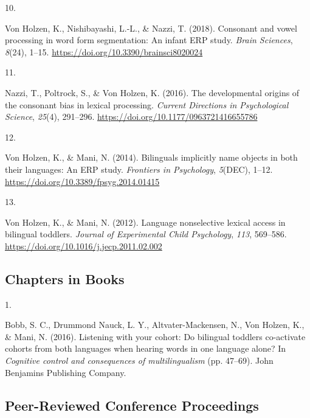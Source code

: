 \documentclass[10pt,a4paper,]{article}
\newlength{\cslhangindent}
\newlength{\csllabelwidth}
\newcommand{\CSLLeftMargin}[1]{\parbox[t]{\csllabelwidth}{\hfill #1~}}
\newcommand{\CSLRightInline}[1]{\parbox[t]{\linewidth - \cslhangindent - \csllabelwidth}{#1}\vspace{0.8ex}}
\begin{document}
\leavevmode{}%
\CSLLeftMargin{10. }%
\CSLRightInline{Von Holzen, K., Nishibayashi, L.-L., \& Nazzi, T.
(2018). Consonant and vowel processing in word form segmentation: An
infant ERP study. \emph{Brain Sciences}, \emph{8}(24), 1--15.
\url{https://doi.org/10.3390/brainsci8020024}}

\leavevmode{}%
\CSLLeftMargin{11. }%
\CSLRightInline{Nazzi, T., Poltrock, S., \& Von Holzen, K. (2016). The
developmental origins of the consonant bias in lexical processing.
\emph{Current Directions in Psychological Science}, \emph{25}(4),
291--296. \url{https://doi.org/10.1177/0963721416655786}}

\leavevmode{}%
\CSLLeftMargin{12. }%
\CSLRightInline{Von Holzen, K., \& Mani, N. (2014). Bilinguals
implicitly name objects in both their languages: An ERP study.
\emph{Frontiers in Psychology}, \emph{5}(DEC), 1--12.
\url{https://doi.org/10.3389/fpsyg.2014.01415}}

\leavevmode{}%
\CSLLeftMargin{13. }%
\CSLRightInline{Von Holzen, K., \& Mani, N. (2012). Language
nonselective lexical access in bilingual toddlers. \emph{Journal of
Experimental Child Psychology}, \emph{113}, 569--586.
\url{https://doi.org/10.1016/j.jecp.2011.02.002}}

\hypertarget{chapters-in-books}{%
\subsection{Chapters in Books}\label{chapters-in-books}}

\hypertarget{bibliography}{}
\leavevmode{}%
\CSLLeftMargin{1. }%
\CSLRightInline{Bobb, S. C., Drummond Nauck, L. Y., Altvater-Mackensen,
N., Von Holzen, K., \& Mani, N. (2016). Listening with your cohort: Do
bilingual toddlers co-activate cohorts from both languages when hearing
words in one language alone? In \emph{Cognitive control and consequences
of multilingualism} (pp. 47--69). John Benjamins Publishing Company.}

\hypertarget{peer-reviewed-conference-proceedings}{%
\subsection{Peer-Reviewed Conference
Proceedings}\label{peer-reviewed-conference-proceedings}}
\end{document}
